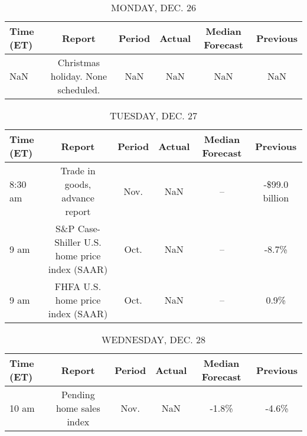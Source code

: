 \documentclass{article}%
\begin{document}
%
\normalsize%


\begin{table}[htbp]%
\caption{MONDAY, DEC. 26}%
\centering%
\begin{adjustbox}{width=1\textwidth}%
\begin{tabular}{lccccc}
\toprule
Time (ET) &                             Report & Period & Actual & Median Forecast & Previous \\
\midrule
      NaN & Christmas holiday. None scheduled. &    NaN &    NaN &             NaN &      NaN \\
\bottomrule
\end{tabular}
%
\end{adjustbox}%
\end{table}

%


\begin{table}[htbp]%
\caption{TUESDAY, DEC. 27}%
\centering%
\begin{adjustbox}{width=1\textwidth}%
\begin{tabular}{lccccc}
\toprule
Time (ET) &                                        Report & Period & Actual & Median Forecast &       Previous \\
\midrule
  8:30 am &                Trade in goods, advance report &   Nov. &    NaN &              -- & -\$99.0 billion \\
     9 am & S\&P Case-Shiller U.S. home price index (SAAR) &   Oct. &    NaN &              -- &          -8.7\% \\
     9 am &             FHFA U.S. home price index (SAAR) &   Oct. &    NaN &              -- &           0.9\% \\
\bottomrule
\end{tabular}
%
\end{adjustbox}%
\end{table}

%


\begin{table}[htbp]%
\caption{WEDNESDAY, DEC. 28}%
\centering%
\begin{adjustbox}{width=1\textwidth}%
\begin{tabular}{lccccc}
\toprule
Time (ET) &                   Report & Period & Actual & Median Forecast & Previous \\
\midrule
    10 am & Pending home sales index &   Nov. &    NaN &           -1.8\% &    -4.6\% \\
\bottomrule
\end{tabular}
%
\end{adjustbox}%
\end{table}
\end{document}
